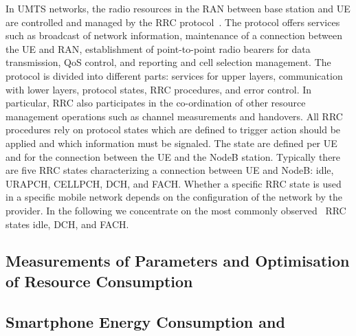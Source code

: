 In UMTS networks, the radio resources in the RAN between base station and UE are controlled and managed by the \gls{RRC} protocol~\cite{3GPP_RRC_Spec}.
The protocol offers services such as broadcast of network information, maintenance of a connection between the \gls{UE} and \gls{RAN}, establishment of point-to-point radio bearers for data transmission, \gls{QoS} control, and reporting and cell selection management.
The protocol is divided into different parts: services for upper layers, communication with lower layers, protocol states, \gls{RRC} procedures, and error control.
In particular, \gls{RRC} also participates in the co-ordination of other resource management operations such as channel measurements and handovers.
All \gls{RRC} procedures rely on protocol states which are defined to trigger action should be applied and which information must be signaled. 
The state are defined per \gls{UE} and for the connection between the \gls{UE} and the \gls{NodeB} station.
Typically there are five \gls{RRC} states characterizing a connection between \gls{UE} and \gls{NodeB}: \gls{idle}, \gls{URAPCH}, \gls{CELLPCH}, \gls{DCH}, and \gls{FACH}.
Whether a specific \gls{RRC} state is used in a specific mobile network depends on the configuration of the network by the provider.
In the following we concentrate on the most commonly observed~\cite{Qian2010} \gls{RRC} states \gls{idle}, \gls{DCH}, and \gls{FACH}.

\subsection{Measurements of  Parameters and Optimisation of Resource Consumption}\label{sec:network:background:measurement_optimisation}

\subsection{Smartphone Energy Consumption and }\label{sec:network:background:energy_consumption_qoe}
